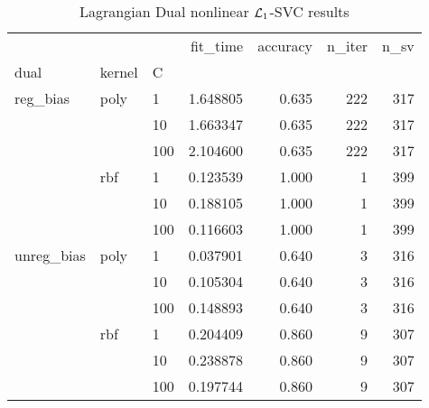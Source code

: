 \begin{table}[H]
\centering
\caption{Lagrangian Dual nonlinear $\protect \mathcal{L}_1$-SVC results}
\label{nonlinear_lagrangian_dual_l1_svc_cv_results}
\begin{tabular}{lllrrrr}
\toprule
           &     &     &  fit\_time &  accuracy &  n\_iter &  n\_sv \\
dual & kernel & C &           &           &         &       \\
\midrule
reg\_bias & poly & 1   &  1.648805 &     0.635 &     222 &   317 \\
           &     & 10  &  1.663347 &     0.635 &     222 &   317 \\
           &     & 100 &  2.104600 &     0.635 &     222 &   317 \\
           & rbf & 1   &  0.123539 &     1.000 &       1 &   399 \\
           &     & 10  &  0.188105 &     1.000 &       1 &   399 \\
           &     & 100 &  0.116603 &     1.000 &       1 &   399 \\
unreg\_bias & poly & 1   &  0.037901 &     0.640 &       3 &   316 \\
           &     & 10  &  0.105304 &     0.640 &       3 &   316 \\
           &     & 100 &  0.148893 &     0.640 &       3 &   316 \\
           & rbf & 1   &  0.204409 &     0.860 &       9 &   307 \\
           &     & 10  &  0.238878 &     0.860 &       9 &   307 \\
           &     & 100 &  0.197744 &     0.860 &       9 &   307 \\
\bottomrule
\end{tabular}
\end{table}
